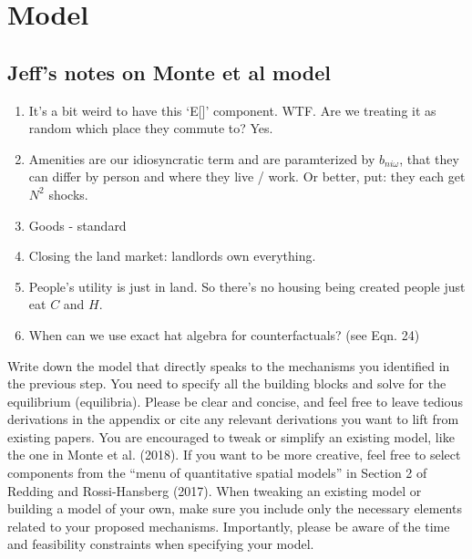 \documentclass{article}
\begin{document}
\section{Model}

\subsection{Jeff's notes on Monte et al model}
\begin{enumerate}
\item It's a bit weird to have this `E[]' component. WTF. Are we treating it as random which place they commute to? Yes.
\item Amenities are our idiosyncratic term and are paramterized by $b_{ni\omega}$, that they can differ by person and where they live / work. Or better, put: they each get $N^2$ shocks.
\item Goods - standard
\item Closing the land market: landlords own everything.
\item People's utility is just in land. So there's no housing being created people just eat $C$ and $H$.
\item  When can we use exact hat algebra for counterfactuals? (see Eqn. 24)
\end{enumerate}

Write down the model that directly speaks to the mechanisms you identified
in the previous step. You need to specify all the building blocks and solve for the
equilibrium (equilibria). Please be clear and concise, and feel free to leave tedious
derivations in the appendix or cite any relevant derivations you want to lift from
existing papers.
You are encouraged to tweak or simplify an existing model, like the one in Monte et
al. (2018). If you want to be more creative, feel free to select components from the
“menu of quantitative spatial models” in Section 2 of Redding and Rossi-Hansberg
(2017). When tweaking an existing model or building a model of your own, make
sure you include only the necessary elements related to your proposed mechanisms.
Importantly, please be aware of the time and feasibility constraints when specifying
your model.
\end{document}
